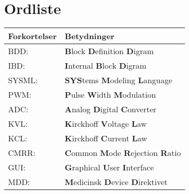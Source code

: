 \section*{Ordliste}
\begin{center}
		\begin{longtable}{ | m{6.5cm} | m{6.5cm}| } 
			\hline
			\textbf{Forkortelser} &\textbf{Betydninger} \\ 
			\hline
			BDD: & \textbf{B}lock \textbf{D}efinition \textbf{D}igram \\
			\hline
			IBD: & \textbf{I}nternal \textbf{B}lock \textbf{D}igram \\  
			\hline
			SYSML: & \textbf{SYS}tems \textbf{M}odeling \textbf{L}anguage \\ 
			\hline
			PWM: & \textbf{P}ulse \textbf{W}idth \textbf{M}odulation \\ 
			\hline	
				
				ADC: & \textbf{A}nalog \textbf{D}igital \textbf{C}onverter  \\ 
				
			\hline
			KVL: & \textbf{K}irckhoff \textbf{V}oltage \textbf{L}aw \\ 
			
			\hline
			KCL: & \textbf{K}irckhoff \textbf{C}urrent \textbf{L}aw \\ 
			
			\hline
			CMRR: & \textbf{C}ommon \textbf{M}ode \textbf{R}ejection \textbf{R}atio \\ 
			
			\hline
			GUI: & \textbf{G}raphical \textbf{U}ser \textbf{I}nterface \\ 
			
			\hline
						MDD: & \textbf{M}edicinsk \textbf{D}evice \textbf{D}irektivet \\ 
			
			\hline
		\end{longtable}
\end{center}